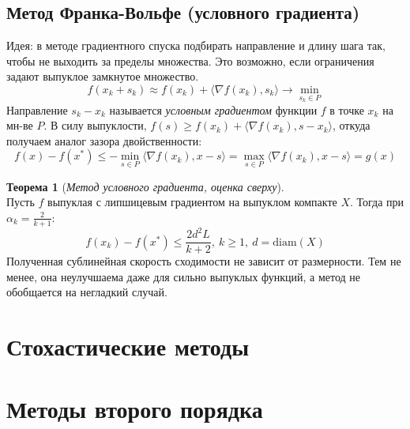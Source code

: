 \documentclass[11pt,a4paper]{report}
\def\le{\leqslant}
\def\ge{\geqslant}
\theoremstyle{definition}
\theoremstyle{definition}
\newtheorem{theorem}{Теорема}[section]
\theoremstyle{definition}
\begin{document}
	\subsection{Метод Франка-Вольфе (условного градиента)}
	Идея: в методе градиентного спуска подбирать направление и длину шага так, чтобы не выходить за пределы множества. Это возможно, если ограничения задают выпуклое замкнутое множество.\\
	$$
		f(x_k + s_k) \approx f(x_k) + \langle \nabla f(x_k), s_k \rangle \to \min_{s_k \in P}
	$$	
	Направление $ s_k - x_k $ называется \textit{условным градиентом} функции $ f $ в точке $ x_k $ на мн-ве $ P $.
	В силу выпуклости, $ f(s) \ge f(x_k) + \langle \nabla f(x_k), s - x_k \rangle $, откуда получаем аналог зазора двойственности:
	$$
		f(x) - f(x^*) \le -\min_{s \in P} \langle \nabla f(x_k), x - s \rangle = \max_{s \in P} \langle \nabla f(x_k), x - s \rangle = g(x)
	$$
	\begin{theorem}[\textit{Метод условного градиента, оценка сверху}]$  $\\
		Пусть $ f $ выпуклая с липшицевым градиентом на выпуклом компакте $ X $. Тогда при $ \alpha_k = \frac{2}{k+1} $:
		$$
			f(x_k) - f(x^*) \le \frac{2d^2L}{k+2},\ k \ge 1,\ d = \mathrm{diam}(X)
		$$
		Полученная сублинейная скорость сходимости не зависит от размерности. Тем не менее, она неулучшаема даже для сильно выпуклых функций, а метод не обобщается на негладкий случай.
	\end{theorem}
	\section{Стохастические методы}
	\section{Методы второго порядка}
\end{document}
